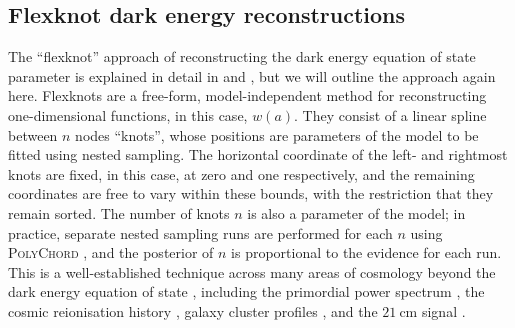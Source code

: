 \documentclass[fleqn,usenatbib]{mnras}
\begin{document}
    \subsection{Flexknot dark energy reconstructions}
    The ``flexknot'' approach of reconstructing the dark energy equation of state parameter is explained in detail in \cite{paper1} and \cite{paper2}, but we will outline the approach again here.
    Flexknots are a free-form, model-independent method for reconstructing one-dimensional functions, in this case, $w(a)$.
    They consist of a linear spline between $n$ nodes ``knots'', whose positions are parameters of the model to be fitted using nested sampling.
    The horizontal coordinate of the left- and rightmost knots are fixed, in this case, at zero and one respectively, and the remaining coordinates are free to vary within these bounds, with the restriction that they remain sorted.
    The number of knots $n$ is also a parameter of the model; in practice, separate nested sampling runs are performed for each $n$ using \textsc{PolyChord} \citep{polychord1, polychord2}, and the posterior of $n$ is proportional to the evidence for each run.
    This is a well-established technique across many areas of cosmology beyond the dark energy equation of state \citep{paper1, paper2, sonke, devazquez}, including the primordial power spectrum \citep{pkhandley, pkvazquez, pkknottedsky, pkcore, pkplanck13, pkplanck15}, the cosmic reionisation history \citep{flexknotreionization, heimersheimfrb}, galaxy cluster profiles \citep{flexknotclusters}, and the $\SI{21}{\centi\metre}$ signal \citep{heimersheim21cm, shen}.
\end{document}
